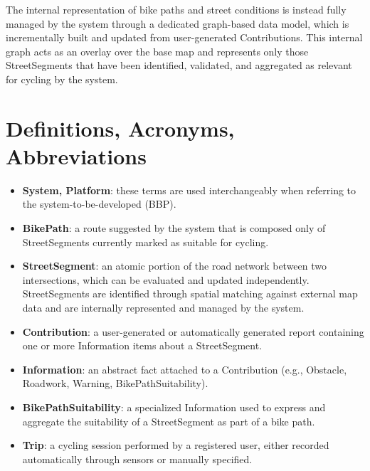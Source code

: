 The internal representation of bike paths and street conditions is instead fully managed by the
system through a dedicated graph-based data model, which is incrementally built and updated
from user-generated Contributions. This internal graph acts as an overlay over the base map
and represents only those StreetSegments that have been identified, validated, and aggregated
as relevant for cycling by the system.




\section{Definitions, Acronyms, Abbreviations}
\label{sec:definition_acronyms_abbreviations}

\begin{itemize}
\item \textbf{System, Platform}: these terms are used interchangeably when referring to the system-to-be-developed (BBP).
\item \textbf{BikePath}: a route suggested by the system that is composed only of StreetSegments currently marked as suitable for cycling.
\item \textbf{StreetSegment}: an atomic portion of the road network between two intersections, which can be evaluated and updated independently. StreetSegments are identified through spatial matching against external map data and are internally represented and managed by the system.
\item \textbf{Contribution}: a user-generated or automatically generated report containing one or more Information items about a StreetSegment.
\item \textbf{Information}: an abstract fact attached to a Contribution (e.g., Obstacle, Roadwork, Warning, BikePathSuitability).
\item \textbf{BikePathSuitability}: a specialized Information used to express and aggregate the suitability of a StreetSegment as part of a bike path.
\item \textbf{Trip}: a cycling session performed by a registered user, either recorded automatically through sensors or manually specified.
\end{itemize}

